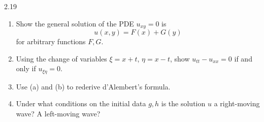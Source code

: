 \documentclass{article}
\begin{document}
\begin{prb}{2.19}
	$ $\newline \vspace{-0.25cm}
	\begin{enumerate}[itemsep =-2pt,label = (\alph{*})]
		\item Show the general solution of the PDE $u_{xy} = 0$ is 
		\begin{equation*}
			u(x, y) = F(x) + G(y) 
		\end{equation*}
		for arbitrary functions $F, G$. 
		\item Using the change of variables $\xi = x + t$, $\eta = x - t$, show $u_{tt} - u_{xx} = 0$ if and only if $u_{\xi\eta} = 0$. 
		\item Use (a) and (b) to rederive d'Alembert's formula. 
		\item Under what conditions on the initial data $g, h$ is the solution $u$ a right-moving wave? A left-moving wave? 
	\end{enumerate}
\end{prb}
\end{document}
